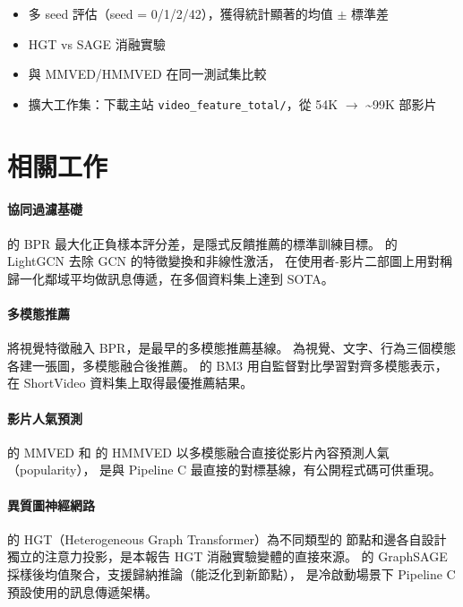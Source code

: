\documentclass[12pt, a4paper]{article}
\begin{document}
\begin{itemize}
\item 多 seed 評估（seed = 0/1/2/42），獲得統計顯著的均值 $\pm$ 標準差
\item HGT vs SAGE 消融實驗
\item 與 MMVED/HMMVED 在同一測試集比較
\item 擴大工作集：下載主站 \texttt{video\_feature\_total/}，從 54K $\to$ \~{}99K 部影片
\end{itemize}

\section{相關工作}
\label{sec:related}

\paragraph{協同過濾基礎}
\citet{rendle2009bpr} 的 BPR 最大化正負樣本評分差，是隱式反饋推薦的標準訓練目標。
\citet{he2020lightgcn} 的 LightGCN 去除 GCN 的特徵變換和非線性激活，
在使用者-影片二部圖上用對稱歸一化鄰域平均做訊息傳遞，在多個資料集上達到 SOTA。

\paragraph{多模態推薦}
\citet{he2016vbpr} 將視覺特徵融入 BPR，是最早的多模態推薦基線。
\citet{wei2019mmgcn} 為視覺、文字、行為三個模態各建一張圖，多模態融合後推薦。
\citet{zhou2023bootstrap} 的 BM3 用自監督對比學習對齊多模態表示，
在 ShortVideo 資料集上取得最優推薦結果。

\paragraph{影片人氣預測}
\citet{xie2020mmved} 的 MMVED 和 \citet{xie2021hmmved} 的 HMMVED
以多模態融合直接從影片內容預測人氣（popularity），
是與 Pipeline C 最直接的對標基線，有公開程式碼可供重現。

\paragraph{異質圖神經網路}
\citet{hu2020heterogeneous} 的 HGT（Heterogeneous Graph Transformer）為不同類型的
節點和邊各自設計獨立的注意力投影，是本報告 HGT 消融實驗變體的直接來源。
\citet{hamilton2017inductive} 的 GraphSAGE 採樣後均值聚合，支援歸納推論（能泛化到新節點），
是冷啟動場景下 Pipeline C 預設使用的訊息傳遞架構。
\end{document}
